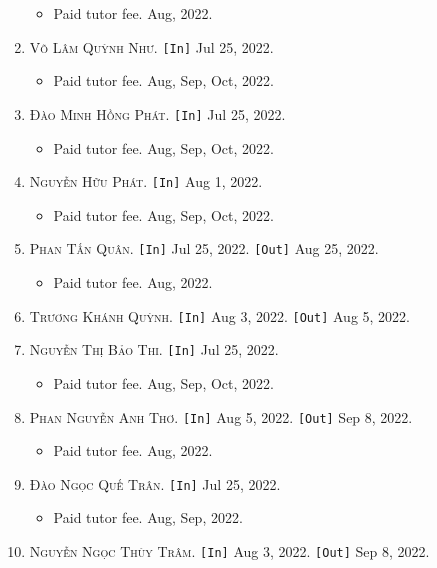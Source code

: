 \documentclass{article}
\numberwithin{equation}{section}
\begin{document}
\begin{enumerate}
	\begin{itemize}
		\item \textsf{Paid tutor fee.} Aug, 2022.
	\end{itemize}
	\item \textsc{Võ Lâm Quỳnh Như.} \texttt{[In]} Jul 25, 2022.
	\begin{itemize}
		\item \textsf{Paid tutor fee.} Aug, Sep, Oct, 2022.
	\end{itemize}
	\item \textsc{Đào Minh Hồng Phát.} \texttt{[In]} Jul 25, 2022.
	\begin{itemize}
		\item \textsf{Paid tutor fee.} Aug, Sep, Oct, 2022.
	\end{itemize}
	\item \textsc{Nguyễn Hữu Phát.} \texttt{[In]} Aug 1, 2022.
	\begin{itemize}
		\item \textsf{Paid tutor fee.} Aug, Sep, Oct, 2022.
	\end{itemize}
	\item \textsc{Phan Tấn Quân.} \texttt{[In]} Jul 25, 2022. \texttt{[Out]} Aug 25, 2022.
	\begin{itemize}
		\item \textsf{Paid tutor fee.} Aug, 2022.
	\end{itemize}
	\item \textsc{Trương Khánh Quỳnh.} \texttt{[In]} Aug 3, 2022. \texttt{[Out]} Aug 5, 2022.
	\item \textsc{Nguyễn Thị Bảo Thi.} \texttt{[In]} Jul 25, 2022.
	\begin{itemize}
		\item \textsf{Paid tutor fee.} Aug, Sep, Oct, 2022.
	\end{itemize}
	\item \textsc{Phan Nguyễn Anh Thơ.} \texttt{[In]} Aug 5, 2022. \texttt{[Out]} Sep 8, 2022.
	\begin{itemize}
		\item \textsf{Paid tutor fee.} Aug, 2022.
	\end{itemize}
	\item \textsc{Đào Ngọc Quế Trân.} \texttt{[In]} Jul 25, 2022.
	\begin{itemize}
		\item \textsf{Paid tutor fee.} Aug, Sep, 2022.
	\end{itemize}
	\item \textsc{Nguyễn Ngọc Thùy Trâm.} \texttt{[In]} Aug 3, 2022. \texttt{[Out]} Sep 8, 2022.

\end{enumerate}
\end{document}
